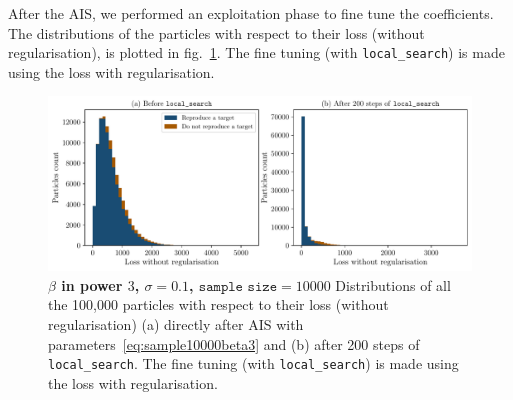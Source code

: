 \documentclass[11pt]{article}
\begin{document}
\begin{enumerate}
	  After the AIS, we performed an exploitation phase to fine tune the coefficients. The distributions of the particles with respect to their loss (without regularisation), is plotted in fig.~\ref{fig:distlocalsearch}. The fine tuning (with \texttt{local\_search}) is made using the loss with regularisation.

	  \begin{figure}[h!]
	  	\centering
	  	\includegraphics[scale=0.75]{Figures/Local_search_2025_05_19_at_06_01_21.pdf}
	  	\caption{{\bfseries \boldmath $\beta$ in power $3$, $\sigma = 0.1$, $\texttt{sample size} = 10000$} Distributions of all the 100,000 particles with respect to their loss (without regularisation) (a) directly after AIS with parameters~\eqref{eq:sample10000beta3} and (b) after 200 steps of \texttt{local\_search}. The fine tuning (with \texttt{local\_search}) is made using the loss with regularisation.}
	  	\label{fig:distlocalsearch}
	  \end{figure}


\end{enumerate}
\end{document}
